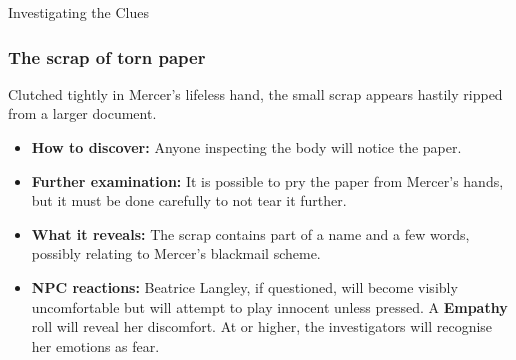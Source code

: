 \begin{CommentBox}{Investigating the Clues}
	\subsubsection*{The scrap of torn paper}
	Clutched tightly in Mercer’s lifeless hand, the small scrap appears hastily ripped from a larger document.
	\begin{itemize}
		\item \textbf{How to discover:} Anyone inspecting the body will notice the paper.
		\item \textbf{Further examination:} It is possible to pry the paper from Mercer's hands, but it must be done carefully to not tear it further.
		\item \textbf{What it reveals:} The scrap contains part of a name and a few words, possibly relating to Mercer's blackmail scheme.
		\item \textbf{NPC reactions:} Beatrice Langley, if questioned, will become visibly uncomfortable but will attempt to play innocent unless pressed. A \Basic \textbf{Empathy} roll will reveal her discomfort. At \Formidable or higher, the investigators will recognise her emotions as fear.
	\end{itemize}
\end{CommentBox}	



